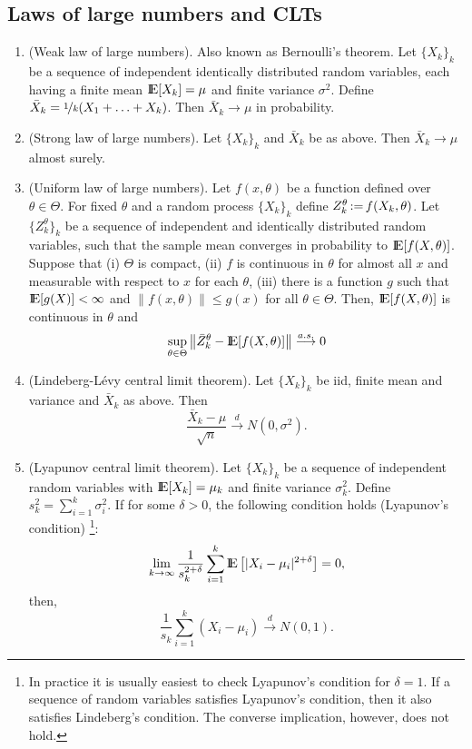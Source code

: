 \documentclass[a4paper,10pt]{article}
\begin{document}
\subsection{Laws of large numbers and CLTs} 
\begin{enumerate}
  \item (Weak law of large numbers). Also known as Bernoulli's theorem. Let $\{X_k\}_k$ be
       a sequence of independent identically distributed random variables, each having a 
       finite mean $\E[X_k]=\mu$ and finite variance $\sigma^2$. Define 
       $\bar{X}_k=\nicefrac{1}{k}(X_1+\ldots+X_k)$. Then $\bar{X}_k\to \mu$ in probability.
   \item (Strong law of large numbers). Let $\{X_k\}_k$ and $\bar{X}_k$ be as above.
         Then $\bar{X}_k\to \mu$ almost surely.    
   \item (Uniform law of large numbers).  Let $f(x,\theta)$ be a function defined over
         $\theta\in\Theta$. For fixed $\theta$ and 
         a random process $\{X_k\}_k$ define $Z_k^\theta {}\mathop{\mathrel{:}=}{} f(X_k, \theta)$. Let 
         $\{Z_k^\theta\}_k$ be a sequence of independent and identically distributed 
         random variables, such that the sample mean converges in probability to $\E[f(X, \theta)]$. 
         Suppose that (i) $\Theta$ is compact, (ii) $f$ is continuous 
         in $\theta$ for almost all $x$ and measurable with respect to $x$ for each $\theta$,
         (iii) there is a function $g$ such that $\E[g(X)]<\infty$ and $\|f(x,\theta)\| \leq g(x)$ 
         for all $\theta\in\Theta$. Then, $\E[f(X,\theta)]$ is continuous in $\theta$ and
         \[
          \sup_{\theta\in\Theta}\left\| 
	    \bar{Z}^\theta_k - \E[f(X,\theta)] 
          \right\|
          \overset{a.s.}{\longrightarrow} 0
         \]

   \item (Lindeberg-L{\'e}vy central limit theorem). Let $\{X_k\}_k$ be iid, finite mean and variance 
         and $\bar{X}_k$ as above. Then
         \[
          \frac{\bar{X}_k-\mu}{\sqrt{n}} \overset{d}{\longrightarrow} N(0, \sigma^2).
         \]

   \item (Lyapunov central limit theorem). Let $\{X_k\}_k$ be a sequence of independent random variables
         with $\E[X_k]=\mu_k$ and finite variance $\sigma_k^2$. Define $s_k^2 = \sum_{i=1}^{k}\sigma_i^2$.
         If for some $\delta>0$, the following condition holds (Lyapunov's condition)%
         \footnote{In practice it is usually easiest to check Lyapunov's condition for $\delta=1$. 
                   If a sequence of random variables satisfies Lyapunov's condition, then it also 
                   satisfies Lindeberg's condition. The converse implication, however, does not hold.}:
         \[
          \lim_{k\to\infty} \frac{1}{s_k^{2+\delta}}\sum_{i=1}^{k}\E\left[ 
          |X_i - \mu_i|^{2+\delta}
          \right]=0,
         \]
	 then,
	 \[
	  \frac{1}{s_k}\sum_{i=1}^{k}(X_i - \mu_i) \overset{d}{\longrightarrow} N(0, 1).
	 \]

\end{enumerate}
\end{document}
